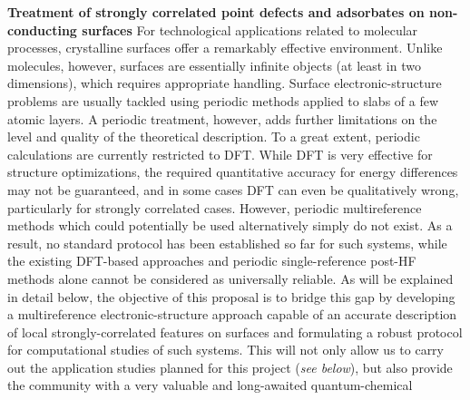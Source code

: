 \documentclass[a4paper,11pt,headings=normal]{scrartcl}
\begin{document}
\noindent
\textbf{Treatment of strongly correlated point defects and adsorbates on 
non-conducting surfaces} For technological applications related to molecular 
processes, crystalline surfaces offer a remarkably effective environment. Unlike 
molecules, however, surfaces are essentially infinite objects (at least in two 
dimensions), which requires appropriate handling.
Surface electronic-structure problems are usually tackled using periodic 
methods applied to slabs of a few atomic layers. 
A periodic treatment, however, adds further limitations on the level and quality 
of the theoretical description. To a great extent, periodic calculations are 
currently restricted to DFT. While DFT is very effective for structure 
optimizations, the required quantitative accuracy for energy differences may not 
be guaranteed, and in some cases DFT can even be qualitatively wrong, particularly 
for strongly correlated cases. 
However, periodic multireference methods which could 
potentially be used alternatively simply do not exist. As a 
result, no standard protocol has been established so far for such systems, 
while the existing DFT-based approaches and periodic single-reference post-HF 
methods\autocite{pisani2008, Booth2013_, usvyat2015, delben2, 
Booth2016, McClain2017, grueneis2018, Wang2020} alone cannot 
be considered as universally reliable. As will be explained in detail below, the 
objective of this proposal is to bridge this gap by developing a 
multireference electronic-structure approach capable of an accurate description of 
local strongly-correlated features on surfaces and formulating a robust protocol 
for computational studies of such systems. This will not only allow us to carry 
out the application studies planned for this project (\textit{see below}), but 
also provide the community with a very valuable and long-awaited quantum-chemical 
\end{document}
